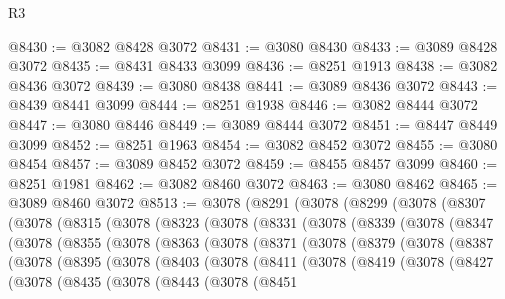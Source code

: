\begin{lexlean}{R3}
\begin{coremodule}
@8430 := @3082 @8428 @3072
@8431 := @3080 @8430
@8433 := @3089 @8428 @3072
@8435 := @8431 @8433 @3099
@8436 := @8251 @1913
@8438 := @3082 @8436 @3072
@8439 := @3080 @8438
@8441 := @3089 @8436 @3072
@8443 := @8439 @8441 @3099
@8444 := @8251 @1938
@8446 := @3082 @8444 @3072
@8447 := @3080 @8446
@8449 := @3089 @8444 @3072
@8451 := @8447 @8449 @3099
@8452 := @8251 @1963
@8454 := @3082 @8452 @3072
@8455 := @3080 @8454
@8457 := @3089 @8452 @3072
@8459 := @8455 @8457 @3099
@8460 := @8251 @1981
@8462 := @3082 @8460 @3072
@8463 := @3080 @8462
@8465 := @3089 @8460 @3072
@8513 := @3078
    (@8291
      (@3078
        (@8299
          (@3078
            (@8307
              (@3078
                (@8315
                  (@3078
                    (@8323
                      (@3078
                        (@8331
                          (@3078
                            (@8339
                              (@3078
                                (@8347
                                  (@3078
                                    (@8355
                                      (@3078
                                        (@8363
                                          (@3078
                                            (@8371
                                              (@3078
                                                (@8379
                                                  (@3078
                                                    (@8387
                                                      (@3078
                                                        (@8395
                                                          (@3078
                                                            (@8403
                                                              (@3078
                                                                (@8411
                                                                  (@3078
                                                                    (@8419
                                                                      (@3078
                                                                        (@8427
                                                                          (@3078
                                                                            (@8435
                                                                              (@3078
                                                                                (@8443
                                                                                  (@3078
                                                                                    (@8451

\end{coremodule}
\end{lexlean}

